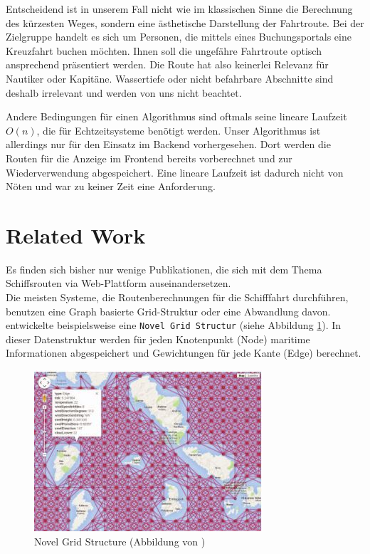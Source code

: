 \documentclass[letterpaper]{article}
\begin{document}
	Entscheidend ist in unserem Fall nicht wie im klassischen Sinne die Berechnung des kürzesten Weges, sondern eine ästhetische Darstellung der Fahrtroute. Bei der Zielgruppe handelt es sich um Personen, die mittels eines Buchungsportals eine Kreuzfahrt buchen möchten. Ihnen soll die ungefähre Fahrtroute optisch ansprechend präsentiert werden. Die Route hat also keinerlei Relevanz für Nautiker oder Kapitäne. Wassertiefe oder nicht befahrbare Abschnitte sind deshalb irrelevant und werden von uns nicht beachtet. 

	Andere Bedingungen für einen Algorithmus sind oftmals seine lineare Laufzeit $O(n)$, die für Echtzeitsysteme benötigt werden. Unser Algorithmus ist allerdings nur für den Einsatz im Backend vorhergesehen. Dort werden die Routen für die Anzeige im Frontend bereits vorberechnet und zur Wiederverwendung abgespeichert. Eine lineare Laufzeit ist dadurch nicht von Nöten und war zu keiner Zeit eine Anforderung.

\section{Related Work}
	Es finden sich bisher nur wenige Publikationen, die sich mit dem Thema Schiffsrouten via Web-Plattform auseinandersetzen.\\

	Die meisten Systeme, die Routenberechnungen für die Schifffahrt durchführen, benutzen eine Graph basierte Grid-Struktur oder eine Abwandlung davon. \cite{makrygiorgos15} entwickelte beispielsweise eine \texttt{Novel Grid Structur} (siehe Abbildung \ref{fig:novel grid structure}). In dieser Datenstruktur werden für jeden Knotenpunkt (Node) maritime Informationen abgespeichert und Gewichtungen für jede Kante (Edge) berechnet.

	\begin{figure}[!htbp]
		\centering
		\includegraphics[width=.8\linewidth]{novel_grid_structure}
		\caption{Novel Grid Structure (Abbildung von \cite{makrygiorgos15})}
		\label{fig:novel grid structure}
	\end{figure}
\end{document}

